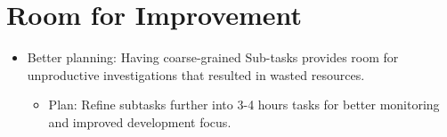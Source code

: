 \section*{Room for Improvement}

\begin{itemize}
   \item Better planning: Having coarse-grained Sub-tasks provides room for unproductive investigations that resulted in wasted resources.
      \begin{itemize}
         \item Plan: Refine subtasks further into 3-4 hours tasks for better monitoring and improved development focus. 
      \end{itemize}
\end{itemize}
